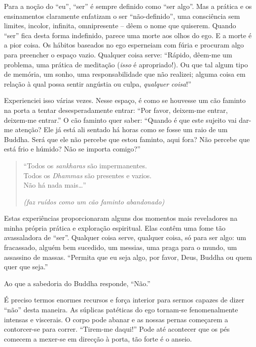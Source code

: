 Para a noção do ``eu'', ``ser'' é sempre definido como ``ser algo''. Mas
a prática e os ensinamentos claramente enfatizam o ser ``não-definido'',
uma consciência sem limites, incolor, infinita, omnipresente -- dêem o
nome que quiserem. Quando ``ser'' fica desta forma indefinido, parece
uma morte aos olhos do ego. E a morte é a pior coisa. Os hábitos
baseados no ego esperneiam com fúria e procuram algo para preencher o
espaço vazio. Qualquer coisa serve: ``Rápido, dêem-me um problema, uma
prática de meditação (\emph{isso} é apropriado!). Ou que tal algum tipo
de memória, um sonho, uma responsabilidade que não realizei; alguma
coisa em relação à qual possa sentir angústia ou culpa, \emph{qualquer
coisa}!''

Experienciei isso várias vezes. Nesse espaço, é como se houvesse um cão
faminto na porta a tentar desesperadamente entrar: ``Por favor,
deixem-me entrar, deixem-me entrar.'' O cão faminto quer saber: ``Quando
é que este sujeito vai dar-me atenção? Ele já está ali sentado há horas
como se fosse um raio de um Buddha. Será que ele não percebe que estou
faminto, aqui fora? Não percebe que está frio e húmido? Não se importa
comigo?''

\begin{quote}
  ``Todos os \emph{sankharas} são impermanentes.\\
  Todos os \emph{Dhammas} são presentes e vazios.\\
  Não há nada mais\ldots{}''

\emph{(faz ruídos como um cão faminto abandonado)}
\end{quote}

Estas experiências proporcionaram alguns dos momentos mais reveladores
na minha própria prática e exploração espiritual. Elas contêm uma fome
tão avassaladora de ``ser''. Qualquer coisa serve, qualquer coisa, só
para ser algo: um fracassado, alguém bem sucedido, um messias, uma praga
para o mundo, um assassino de massas. ``Permita que eu seja algo, por
favor, Deus, Buddha ou quem quer que seja.''

Ao que a sabedoria do Buddha responde, ``Não.''

É preciso termos enormes recursos e força interior para sermos capazes
de dizer ``não'' desta maneira. As súplicas patéticas do ego tornam-se
fenomenalmente intensas e viscerais. O corpo pode abanar e as nossas
pernas começarem a contorcer-se para correr. ``Tirem-me daqui!'' Pode
até acontecer que os pés comecem a mexer-se em direcção à porta, tão
forte é o anseio.

